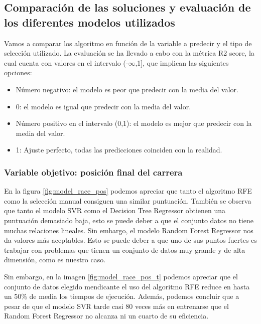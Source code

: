\subsection{Comparación de las soluciones y evaluación de los diferentes modelos utilizados}

Vamos a comparar los algoritmo en función de la variable a predecir y el tipo de selección utilizado. La evaluación se ha llevado a cabo con la métrica R2 score, la cual cuenta con valores en el intervalo (-$\infty$,1], que implican las siguientes opciones:
\begin{itemize}
    \item Número negativo: el modelo es peor que predecir con la media del valor.
    \item 0: el modelo es igual que predecir con la media del valor.
    \item Número positivo en el intervalo (0,1): el modelo es mejor que predecir con la media del valor.
    \item 1: Ajuste perfecto, todas las predicciones coinciden con la realidad.
\end{itemize}

\subsubsection{Variable objetivo: posición final del carrera}
En la figura \ref{fig:model_race_pos} podemos apreciar que tanto el algoritmo RFE  como la selección manual consiguen una similar puntuación. También se observa que tanto el modelo SVR como el Decision Tree Regressor obtienen una puntuación demasiado baja, esto se puede deber a que el conjunto datos no tiene muchas relaciones lineales. Sin embargo, el modelo Random Forest Regressor nos da valores más aceptables. Esto se puede deber a que uno de sus puntos fuertes es trabajar con problemas que tienen un conjunto de datos muy grande y de alta dimensión, como es nuestro caso.


Sin embargo, en la imagen \ref{fig:model_race_pos_t} podemos apreciar que el conjunto de datos elegido mendicante el uso del algoritmo RFE reduce en hasta un 50\% de media los tiempos de ejecución. Además, podemos concluir que a pesar de que el modelo SVR tarde casi 80 veces más en entrenarse que el Random Forest Regressor no alcanza ni un cuarto de su eficiencia.



